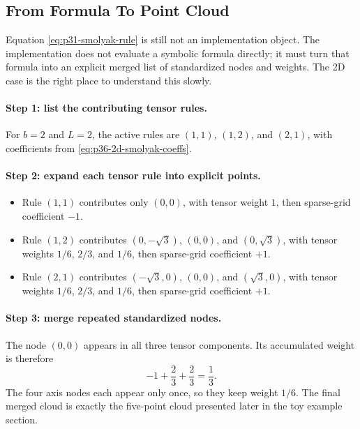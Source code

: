 \documentclass[11pt]{article}
\numberwithin{equation}{section}
\begin{document}
\subsection{From Formula To Point Cloud}
\label{subsec:p32-cloud-construction}

Equation \eqref{eq:p31-smolyak-rule} is still not an implementation object.
The implementation does not evaluate a symbolic formula directly; it must turn
that formula into an explicit merged list of standardized nodes and weights.
The 2D case is the right place to understand this slowly.

\paragraph{Step 1: list the contributing tensor rules.}
For \(b=2\) and \(L=2\), the active rules are \((1,1)\), \((1,2)\), and
\((2,1)\), with coefficients from \eqref{eq:p36-2d-smolyak-coeffs}.

\paragraph{Step 2: expand each tensor rule into explicit points.}
\begin{itemize}[leftmargin=0.28in]
  \item Rule \((1,1)\) contributes only \((0,0)\), with tensor weight \(1\),
  then sparse-grid coefficient \(-1\).
  \item Rule \((1,2)\) contributes
  \((0,-\sqrt3)\), \((0,0)\), and \((0,\sqrt3)\), with tensor weights
  \(1/6\), \(2/3\), and \(1/6\), then sparse-grid coefficient \(+1\).
  \item Rule \((2,1)\) contributes
  \((-\sqrt3,0)\), \((0,0)\), and \((\sqrt3,0)\), with tensor weights
  \(1/6\), \(2/3\), and \(1/6\), then sparse-grid coefficient \(+1\).
\end{itemize}

\paragraph{Step 3: merge repeated standardized nodes.}
The node \((0,0)\) appears in all three tensor components.  Its accumulated
weight is therefore
\begin{equation}
  -1 + \frac23 + \frac23 = \frac13.
  \label{eq:p36-origin-merge}
\end{equation}
The four axis nodes each appear only once, so they keep weight \(1/6\).
The final merged cloud is exactly the five-point cloud presented later in the toy
example section.
\end{document}
